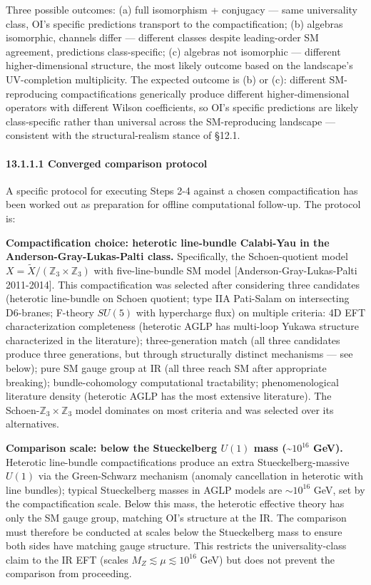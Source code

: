 \documentclass[
]{article}
\begin{document}
Three possible outcomes: (a) full isomorphism + conjugacy --- same
universality class, OI's specific predictions transport to the
compactification; (b) algebras isomorphic, channels differ --- different
classes despite leading-order SM agreement, predictions class-specific;
(c) algebras not isomorphic --- different higher-dimensional structure,
the most likely outcome based on the landscape's UV-completion
multiplicity. The expected outcome is (b) or (c): different
SM-reproducing compactifications generically produce different
higher-dimensional operators with different Wilson coefficients, so OI's
specific predictions are likely class-specific rather than universal
across the SM-reproducing landscape --- consistent with the
structural-realism stance of §12.1.

\hypertarget{converged-comparison-protocol}{%
\paragraph{13.1.1.1 Converged comparison
protocol}\label{converged-comparison-protocol}}

A specific protocol for executing Steps 2-4 against a chosen
compactification has been worked out as preparation for offline
computational follow-up. The protocol is:

\textbf{Compactification choice: heterotic line-bundle Calabi-Yau in the
Anderson-Gray-Lukas-Palti class.} Specifically, the Schoen-quotient
model \(X = \tilde{X}/(\mathbb{Z}_3 \times \mathbb{Z}_3)\) with
five-line-bundle SM model {[}Anderson-Gray-Lukas-Palti 2011-2014{]}.
This compactification was selected after considering three candidates
(heterotic line-bundle on Schoen quotient; type IIA Pati-Salam on
intersecting D6-branes; F-theory \(SU(5)\) with hypercharge flux) on
multiple criteria: 4D EFT characterization completeness (heterotic AGLP
has multi-loop Yukawa structure characterized in the literature);
three-generation match (all three candidates produce three generations,
but through structurally distinct mechanisms --- see below); pure SM
gauge group at IR (all three reach SM after appropriate breaking);
bundle-cohomology computational tractability; phenomenological
literature density (heterotic AGLP has the most extensive literature).
The Schoen-\(\mathbb{Z}_3 \times \mathbb{Z}_3\) model dominates on most
criteria and was selected over its alternatives.

\textbf{Comparison scale: below the Stueckelberg \(U(1)\) mass
(\textasciitilde{}\(10^{16}\) GeV).} Heterotic line-bundle
compactifications produce an extra Stueckelberg-massive \(U(1)\) via the
Green-Schwarz mechanism (anomaly cancellation in heterotic with line
bundles); typical Stueckelberg masses in AGLP models are
\(\sim 10^{16}\) GeV, set by the compactification scale. Below this
mass, the heterotic effective theory has only the SM gauge group,
matching OI's structure at the IR. The comparison must therefore be
conducted at scales below the Stueckelberg mass to ensure both sides
have matching gauge structure. This restricts the universality-class
claim to the IR EFT (scales \(M_Z \lesssim \mu \lesssim 10^{16}\) GeV)
but does not prevent the comparison from proceeding.
\end{document}
